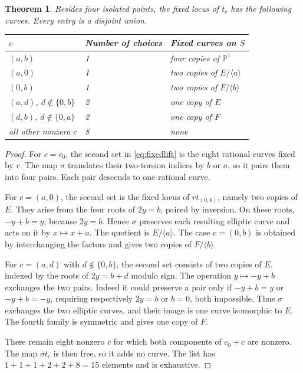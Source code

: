 \documentclass[11pt]{amsart}
\newtheorem{theorem}{Theorem}[section]
\theoremstyle{definition}
\begin{document}
\begin{theorem}\label{thm:descent}
Besides four isolated points, the fixed locus of $\overline t_c$ has
the following curves. Every entry is a disjoint union.
\begin{center}
\begin{tabular}{@{}lll@{}}\toprule
$c$ & Number of choices & Fixed curves on $S$\\\midrule
$(a,b)$ & 1 & four copies of $\mathbb P^1$\\
$(a,0)$ & 1 & two copies of $E/\langle a\rangle$\\
$(0,b)$ & 1 & two copies of $F/\langle b\rangle$\\
$(a,d)$, $d\notin\{0,b\}$ & 2 & one copy of $E$\\
$(d,b)$, $d\notin\{0,a\}$ & 2 & one copy of $F$\\
all other nonzero $c$ & 8 & none\\\bottomrule
\end{tabular}
\end{center}
\end{theorem}
\begin{proof}
For $c=c_0$, the second set in \eqref{eq:fixedlift} is the eight
rational curves fixed by $r$. The map $\sigma$ translates their
two-torsion indices by $b$ or $a$, so it pairs them into four pairs.
Each pair descends to one rational curve.

For $c=(a,0)$, the second set is the fixed locus of $rt_{(0,b)}$,
namely two copies of $E$. They arise from the four roots of $2y=b$,
paired by inversion. On these roots, $-y+b=y$, because $2y=b$.
Hence $\sigma$ preserves each resulting elliptic curve and acts on it
by $x\mapsto x+a$. The quotient is $E/\langle a\rangle$.
The case $c=(0,b)$ is obtained by interchanging the factors and gives
two copies of $F/\langle b\rangle$.

For $c=(a,d)$ with $d\notin\{0,b\}$, the second set consists of two
copies of $E$, indexed by the roots of $2y=b+d$ modulo sign.
The operation $y\mapsto-y+b$ exchanges the two pairs. Indeed it could
preserve a pair only if $-y+b=y$ or $-y+b=-y$, requiring respectively
$2y=b$ or $b=0$, both impossible. Thus $\sigma$ exchanges the two
elliptic curves, and their image is one curve isomorphic to $E$.
The fourth family is symmetric and gives one copy of $F$.

There remain eight nonzero $c$ for which both components of $c_0+c$
are nonzero. The map $\sigma t_c$ is then free, so it adds no curve.
The list has $1+1+1+2+2+8=15$ elements and is exhaustive.
\end{proof}
\end{document}

